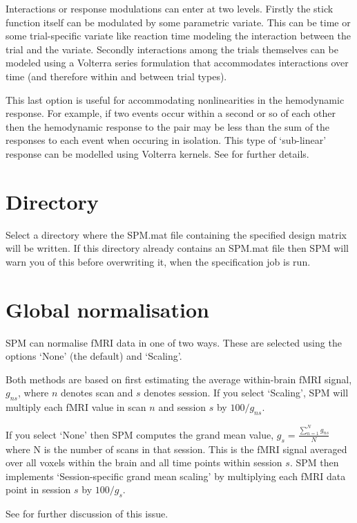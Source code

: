 Interactions or response modulations can enter at two levels.  Firstly the stick function itself can be modulated by some parametric variate. This can be time or some trial-specific variate like reaction time modeling the interaction between the trial and the variate. Secondly interactions among the trials themselves can be modeled using a Volterra series formulation that accommodates interactions over time (and therefore within and between trial types). 

This last option is useful 
for accommodating nonlinearities in the hemodynamic response. For 
example, if two events occur within a 
second or so of each other then the hemodynamic response to 
the pair may be less than the sum of the responses to each event when occuring in isolation. This type of `sub-linear' response can be modelled using
Volterra kernels. See \cite{balloon} for further details.

\section{Directory}
Select a directory where the SPM.mat file containing the specified design matrix will be written. If this directory already contains an SPM.mat file then SPM will warn you of this before overwriting it, when the specification job is run.


\section{Global normalisation}

SPM can normalise fMRI data in one of two ways. These are 
selected using the options `None' (the default) and `Scaling'. 

Both methods are based on first estimating the average within-brain fMRI signal, $g_{ns}$, where $n$ denotes scan and $s$ denotes session.
If you select `Scaling', SPM will multiply each fMRI value in scan $n$ and session $s$ by $100/g_{ns}$.

If you select `None' then SPM computes the grand mean value, $g_s=\frac{\sum_{n=1}^N g_{ns}}{N}$ where N is the number of scans in that 
session.
This is the fMRI signal averaged over all voxels within the brain and all time points within session $s$. SPM then implements `Session-specific grand mean scaling' by multiplying each fMRI data point in session $s$ by $100/g_s$. 
 
See \cite{ja_global} for further discussion of this issue.


